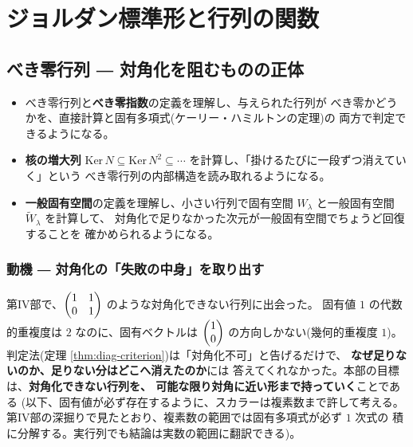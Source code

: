\part{ジョルダン標準形と行列の関数}

\chapter{べき零行列 ― 対角化を阻むものの正体}\label{chap:nilp}

\begin{goal}
\begin{itemize}
\item べき零行列と\textbf{べき零指数}の定義を理解し、与えられた行列が
べき零かどうかを、直接計算と固有多項式(ケーリー・ハミルトンの定理)の
両方で判定できるようになる。
\item \textbf{核の増大列} $\mathrm{Ker}\,N \subseteq \mathrm{Ker}\,N^2
\subseteq \cdots$ を計算し、「掛けるたびに一段ずつ消えていく」という
べき零行列の内部構造を読み取れるようになる。
\item \textbf{一般固有空間}の定義を理解し、小さい行列で固有空間
$W_\lambda$ と一般固有空間 $\widetilde{W}_\lambda$ を計算して、
対角化で足りなかった次元が一般固有空間でちょうど回復することを
確かめられるようになる。
\end{itemize}
\end{goal}

\section{動機 ― 対角化の「失敗の中身」を取り出す}

第IV部で、$\begin{pmatrix}1 & 1 \\ 0 & 1\end{pmatrix}$ のような対角化できない行列に出会った。
固有値 $1$ の代数的重複度は $2$ なのに、固有ベクトルは
$\begin{pmatrix}1 \\ 0\end{pmatrix}$ の方向しかない(幾何的重複度 $1$)。
判定法(定理 \ref{thm:diag-criterion})は「対角化不可」と告げるだけで、
\textbf{なぜ足りないのか、足りない分はどこへ消えたのか}には
答えてくれなかった。本部の目標は、\textbf{対角化できない行列を、
可能な限り対角に近い形まで持っていく}ことである
(以下、固有値が必ず存在するように、スカラーは複素数まで許して考える。
第IV部の深掘りで見たとおり、複素数の範囲では固有多項式が必ず $1$ 次式の
積に分解する。実行列でも結論は実数の範囲に翻訳できる)。

